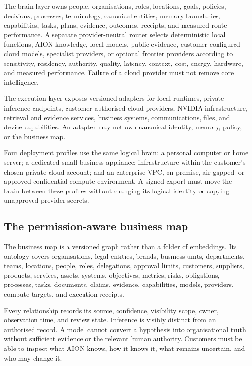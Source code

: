 The brain layer owns people, organisations, roles, locations, goals, policies,
decisions, processes, terminology, canonical entities, memory boundaries,
capabilities, tasks, plans, evidence, outcomes, receipts, and measured route
performance.  A separate provider-neutral router selects deterministic local
functions, AION knowledge, local models, public evidence, customer-configured
cloud models, specialist providers, or optional frontier providers according
to sensitivity, residency, authority, quality, latency, context, cost, energy,
hardware, and measured performance.  Failure of a cloud provider must not
remove core intelligence.

The execution layer exposes versioned adapters for local runtimes, private
inference endpoints, customer-authorised cloud providers, NVIDIA infrastructure,
retrieval and evidence services, business systems, communications, files, and
device capabilities.  An adapter may not own canonical identity, memory,
policy, or the business map.

Four deployment profiles use the same logical brain: a personal computer or
home server; a dedicated small-business appliance; infrastructure within the
customer's chosen private-cloud account; and an enterprise VPC, on-premise,
air-gapped, or approved confidential-compute environment.  A signed export must
move the brain between these profiles without changing its logical identity or
copying unapproved provider secrets.

\subsection{The permission-aware business map}

The business map is a versioned graph rather than a folder of embeddings.  Its
ontology covers organisations, legal entities, brands, business units,
departments, teams, locations, people, roles, delegations, approval limits,
customers, suppliers, products, services, assets, systems, objectives, metrics,
risks, obligations, processes, tasks, documents, claims, evidence,
capabilities, models, providers, compute targets, and execution receipts.

Every relationship records its source, confidence, visibility scope, owner,
observation time, and review state.  Inference is visibly distinct from an
authorised record.  A model cannot convert a hypothesis into organisational
truth without sufficient evidence or the relevant human authority.  Customers
must be able to inspect what AION knows, how it knows it, what remains uncertain,
and who may change it.

